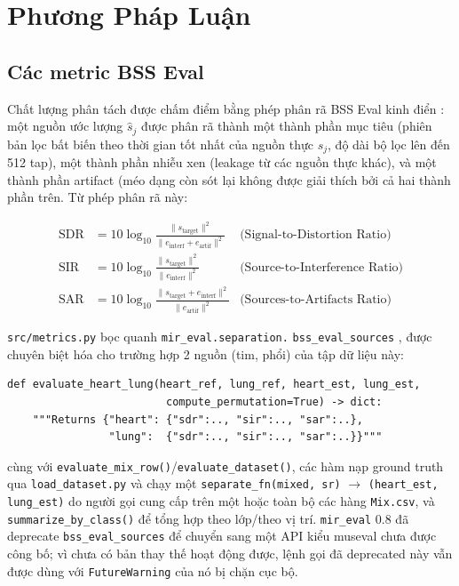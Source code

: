 \documentclass[11pt]{article}
\begin{document}
\section{Phương Pháp Luận}
\label{sec:method}

\subsection{Các metric BSS Eval}
\label{sec:metrics}

Chất lượng phân tách được chấm điểm bằng phép phân rã BSS Eval kinh điển
\cite{vincent2006}: một nguồn ước lượng $\hat{s}_j$ được phân rã thành một
thành phần mục tiêu (phiên bản lọc bất biến theo thời gian tốt nhất của
nguồn thực $s_j$, độ dài bộ lọc lên đến 512 tap), một thành phần nhiễu
xen (leakage từ các nguồn thực khác), và một thành phần artifact (méo
dạng còn sót lại không được giải thích bởi cả hai thành phần trên. Từ
phép phân rã này:

\begin{align}
\text{SDR} &= 10\log_{10}\frac{\lVert s_{\text{target}} \rVert^2}
  {\lVert e_{\text{interf}} + e_{\text{artif}} \rVert^2}
  & \text{(Signal-to-Distortion Ratio)} \\
\text{SIR} &= 10\log_{10}\frac{\lVert s_{\text{target}} \rVert^2}
  {\lVert e_{\text{interf}} \rVert^2}
  & \text{(Source-to-Interference Ratio)} \\
\text{SAR} &= 10\log_{10}\frac{\lVert s_{\text{target}} + e_{\text{interf}} \rVert^2}
  {\lVert e_{\text{artif}} \rVert^2}
  & \text{(Sources-to-Artifacts Ratio)}
\end{align}

\texttt{src/metrics.py} bọc quanh \texttt{mir\_eval.separation.}
\texttt{bss\_eval\_sources} \cite{mireval}, được chuyên biệt hóa cho
trường hợp 2 nguồn (tim, phổi) của tập dữ liệu này:

\begin{lstlisting}
def evaluate_heart_lung(heart_ref, lung_ref, heart_est, lung_est,
                         compute_permutation=True) -> dict:
    """Returns {"heart": {"sdr":.., "sir":.., "sar":..},
                "lung":  {"sdr":.., "sir":.., "sar":..}}"""
\end{lstlisting}

cùng với \texttt{evaluate\_mix\_row()}/\texttt{evaluate\_dataset()}, các
hàm nạp ground truth qua \texttt{load\_dataset.py} và chạy một
\texttt{separate\_fn(mixed, sr)} $\to$
\texttt{(heart\_est, lung\_est)} do người gọi cung cấp trên một hoặc toàn
bộ các hàng \texttt{Mix.csv}, và \texttt{summarize\_by\_class()} để tổng
hợp theo lớp/theo vị trí. \texttt{mir\_eval} 0.8 đã deprecate
\texttt{bss\_eval\_sources} để chuyển sang một API kiểu museval chưa được
công bố; vì chưa có bản thay thế hoạt động được, lệnh gọi đã deprecated
này vẫn được dùng với \texttt{FutureWarning} của nó bị chặn cục bộ.
\end{document}
